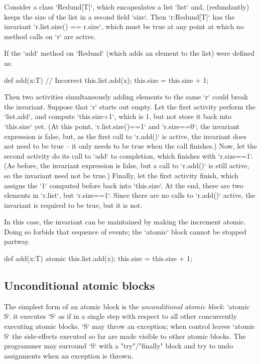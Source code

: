 \begin{ex}
Consider a class \xcd`Redund[T]`, which encapsulates a list
\xcd`list` and, (redundantly) keeps the size of the list in a second field
\xcd`size`.  Then \xcd`r:Redund[T]` has the invariant 
\xcd`r.list.size() == r.size`, which must be true at any point at which
no method calls on \xcd`r` are active.

If the \xcd`add` method on \xcd`Redund` (which adds an element to the list) 
were defined as: 
\begin{xten}
def add(x:T) { // Incorrect
  this.list.add(x);
  this.size = this.size + 1;
}
\end{xten}
Then two activities simultaneously adding elements to the same \xcd`r` could break the
invariant.  Suppose that \xcd`r` starts out empty.  Let the first activity
perform the \xcd`list.add`, and compute \xcd`this.size+1`, which is 1, but not store it
back into \xcd`this.size` yet.  
(At this point, \xcd`r.list.size()==1` and \xcd`r.size==0`; the invariant
expression is false, but, as the first call to \xcd`r.add()` is active, the
invariant does not need to be true -- it only needs to be true when the
call finishes.)
Now, let the second activity do its call to
\xcd`add` to completion, which finishes with \xcd`r.size==1`.  
(As before, the invariant expression is false, but a call to \xcd`r.add()` is
still active, so the invariant need not be true.)
Finally, let
the first activity finish, which assigns the \xcd`1` computed before back into
\xcd`this.size`.  At the end, there are two elements in \xcd`r.list`, but
\xcd`r.size==1`. Since there are no calls to \xcd`r.add()` active, the
invariant is required to be true, but it is not.

In this case, the invariant can be maintained by making the increment atomic.
Doing so forbids that sequence of events; the \xcd`atomic` block cannot be
stopped partway.  
\begin{xten}
def add(x:T) { 
  atomic {
    this.list.add(x);
    this.size = this.size + 1; 
  }
}
\end{xten}
\end{ex}

\subsection{Unconditional atomic blocks}
The simplest form of an atomic block is the {\em unconditional
atomic block}: \xcd`atomic S`.  it executes \xcd`S` as if in a single
step with respect to all other concurrently executing atomic
blocks. \xcd`S` may 
throw an exception; when control leaves \xcd`atomic S` the
side-effects executed so far are made visible to other atomic blocks.  
The programmer may surround \xcd`S` with a \xcd"try"/\xcd"finally"
block and try to undo assignments when an exception is thrown. 

